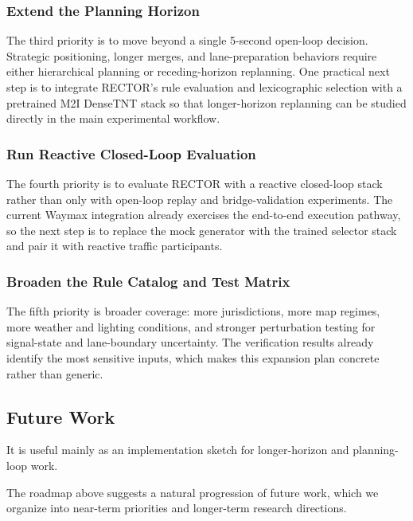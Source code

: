 \subsubsection{Extend the Planning Horizon}
The third priority is to move beyond a single 5-second open-loop decision.  Strategic positioning, longer merges, and lane-preparation behaviors require either hierarchical planning or receding-horizon replanning.  One practical next step is to integrate RECTOR's rule evaluation and lexicographic selection with a pretrained M2I DenseTNT stack so that longer-horizon replanning can be studied directly in the main experimental workflow.

\subsubsection{Run Reactive Closed-Loop Evaluation}
The fourth priority is to evaluate RECTOR with a reactive closed-loop stack rather than only with open-loop replay and bridge-validation experiments.  The current Waymax integration already exercises the end-to-end execution pathway, so the next step is to replace the mock generator with the trained selector stack and pair it with reactive traffic participants.

\subsubsection{Broaden the Rule Catalog and Test Matrix}
The fifth priority is broader coverage: more jurisdictions, more map regimes, more weather and lighting conditions, and stronger perturbation testing for signal-state and lane-boundary uncertainty.  The verification results already identify the most sensitive inputs, which makes this expansion plan concrete rather than generic.

\subsection{Future Work}
\label{subsec:future_work}

It is useful mainly as an implementation sketch for longer-horizon and planning-loop work.

The roadmap above suggests a natural progression of future work, which we organize into near-term priorities and longer-term research directions.

